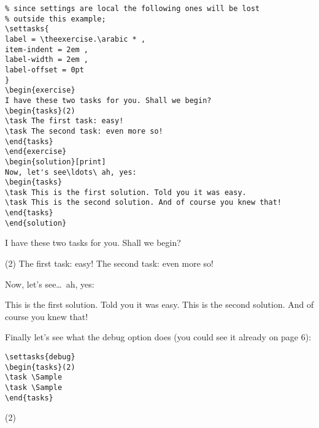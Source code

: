 \documentclass[a4paper,12pt,indent]{article}
\begin{document}
\begin{tcolorbox}[collower=black,colframe=Tasks,colback=white]
    \begin{lstlisting}
% since settings are local the following ones will be lost
% outside this example;
\settasks{
label = \theexercise.\arabic * ,
item-indent = 2em ,
label-width = 2em ,
label-offset = 0pt
}
\begin{exercise}
I have these two tasks for you. Shall we begin?
\begin{tasks}(2)
\task The first task: easy!
\task The second task: even more so!
\end{tasks}
\end{exercise}
\begin{solution}[print]
Now, let's see\ldots\ ah, yes:
\begin{tasks}
\task This is the first solution. Told you it was easy.
\task This is the second solution. And of course you knew that!
\end{tasks}
\end{solution}
\end{lstlisting}
        \tcblower
    I have these two tasks for you. Shall we begin?
    \begin{tasks}[style=enumerate](2)
    \task The first task: easy!
    \task The second task: even more so!
    \end{tasks}

    Now, let's see\ldots\ ah, yes:
    \begin{tasks}[style=enumerate]
    \task This is the first solution. Told you it was easy.
    \task This is the second solution. And of course you knew that!
    \end{tasks}
           \end{tcolorbox}

Finally let’s see what the debug option does (you could see it already on page 6):

\begin{tcolorbox}[collower=black,colframe=Tasks,colback=white]
    \begin{lstlisting}
\settasks{debug}
\begin{tasks}(2)
\task \Sample
\task \Sample
\end{tasks}
\end{lstlisting}
        \tcblower
        \begin{tasks}(2)
        \task \Sample
        \task \Sample
        \end{tasks}
           \end{tcolorbox}
\end{document}
